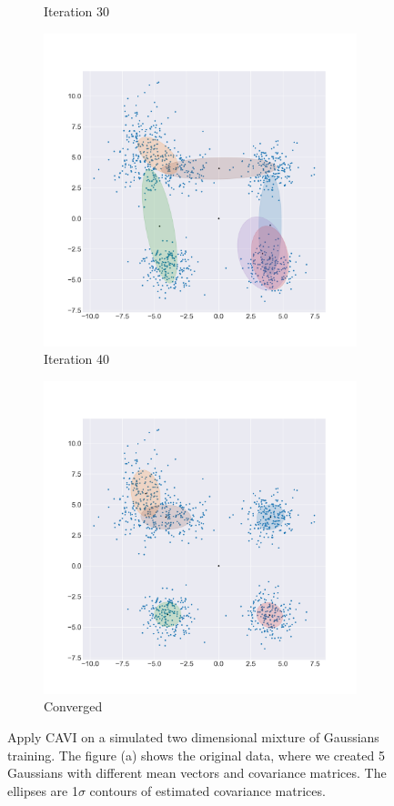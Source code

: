 \documentclass[letterpaper]{article}
\begin{document}
\begin{figure}[H]
\begin{subfigure}[b]{0.25\linewidth}
     \caption{Iteration 30}
  \end{subfigure}
  \begin{subfigure}[b]{0.25\linewidth}
    \includegraphics[width=\linewidth]{outputs/simulation/iter_40.png}
    \caption{Iteration 40}
  \end{subfigure}
  \begin{subfigure}[b]{0.22\linewidth}
    \includegraphics[width=\linewidth]{outputs/simulation/final.png}
    \caption{Converged}
  \end{subfigure}
  \caption{Apply CAVI on a simulated two dimensional mixture of Gaussians training. The figure (a) shows the original data, where we created 5 Gaussians with different mean vectors and covariance matrices. The ellipses are 1$\sigma$ contours of estimated covariance matrices.}
\end{figure}
\end{document}
